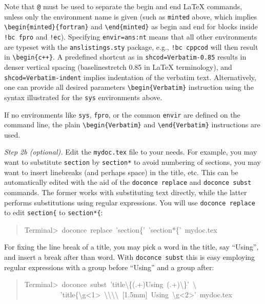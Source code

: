 \documentclass[a4paper]{article}
\begin{document}
Note that \texttt{@} must be used to separate the begin and end LaTeX
commands, unless only the environment name is given (such as \texttt{minted}
above, which implies \texttt{\textbackslash{}begin\{minted\}\{fortran\}} and \texttt{\textbackslash{}end\{minted\}} as
begin and end for blocks inside \texttt{!bc fpro} and \texttt{!ec}).  Specifying
\texttt{envir=ans:nt} means that all other environments are typeset with the
\texttt{anslistings.sty} package, e.g., \texttt{!bc cppcod} will then result in
\texttt{\textbackslash{}begin\{c++\}}. A predefined shortcut as in \texttt{shcod=Verbatim-0.85}
results in denser
vertical spacing (baselinestretch 0.85 in LaTeX terminology), and
\texttt{shcod=Verbatim-indent} implies indentation of the verbatim text.
Alternatively, one can provide all desired parameters
\texttt{\textbackslash{}begin\{Verbatim\}} instruction using the syntax illustrated for
the \texttt{sys} environments above.

If no environments like \texttt{sys}, \texttt{fpro}, or the common
\texttt{envir} are defined on the command line, the plain \texttt{\textbackslash{}begin\{Verbatim\}}
and \texttt{\textbackslash{}end\{Verbatim\}} instructions are used.

\emph{Step 2b (optional).} Edit the \texttt{mydoc.tex} file to your needs.
For example, you may want to substitute \texttt{section} by \texttt{section*} to
avoid numbering of sections, you may want to insert linebreaks
(and perhaps space) in the title, etc. This can be automatically
edited with the aid of the \texttt{doconce replace} and \texttt{doconce subst}
commands. The former works with substituting text directly, while the
latter performs substitutions using regular expressions.
You will use \texttt{doconce replace} to edit \texttt{section\{} to \texttt{section*\{}:
%
\begin{quote}{\ttfamily \raggedright \noindent
Terminal>~doconce~replace~'section\{'~'section*\{'~mydoc.tex
}
\end{quote}

For fixing the line break of a title, you may pick a word in the
title, say ``Using'', and insert a break after than word. With
\texttt{doconce subst} this is easy employing regular expressions with
a group before ``Using'' and a group after:
%
\begin{quote}{\ttfamily \raggedright \noindent
Terminal>~doconce~subst~'title\textbackslash{}\{(.+)Using~(.+)\textbackslash{}\}'~\textbackslash{}\\
~~~~~~~~~~'title\{\textbackslash{}g<1>~\textbackslash{}\textbackslash{}\textbackslash{}\textbackslash{}~{[}1.5mm{]}~Using~\textbackslash{}g<2>'~mydoc.tex
}
\end{quote}
\end{document}
